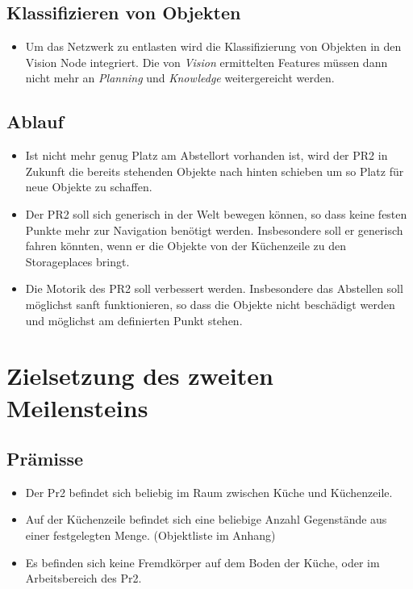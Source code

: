 \documentclass{suturo}
\begin{document}
\subsection*{Klassifizieren von Objekten}
\begin{itemize}
\item Um das Netzwerk zu entlasten wird die Klassifizierung von Objekten in den Vision Node integriert. Die von \textit{Vision} ermittelten Features müssen dann nicht mehr an \textit{Planning} und \textit{Knowledge} weitergereicht werden.
\end{itemize}

\subsection*{Ablauf}
\begin{itemize}
\item Ist nicht mehr genug Platz am Abstellort vorhanden ist, wird der PR2 in Zukunft die bereits stehenden Objekte nach hinten schieben um so Platz für neue Objekte zu schaffen.
\item Der PR2 soll sich generisch in der Welt bewegen können, so dass keine festen Punkte mehr zur Navigation benötigt werden. Insbesondere soll er generisch fahren könnten, wenn er die Objekte von der Küchenzeile zu den Storageplaces bringt.
\item Die Motorik des PR2 soll verbessert werden. Insbesondere das Abstellen soll möglichst sanft funktionieren, so dass die Objekte nicht beschädigt werden und möglichst am definierten Punkt stehen.
\end{itemize}

\section{Zielsetzung des zweiten Meilensteins}
\subsection{Prämisse}
\begin{itemize}
\item Der Pr2 befindet sich beliebig im Raum zwischen Küche und Küchenzeile.
\item Auf der Küchenzeile befindet sich eine beliebige Anzahl Gegenstände aus einer festgelegten Menge. (Objektliste im Anhang)
\item Es befinden sich keine Fremdkörper auf dem Boden der Küche, oder im Arbeitsbereich des Pr2.
\end{itemize}
\end{document}
